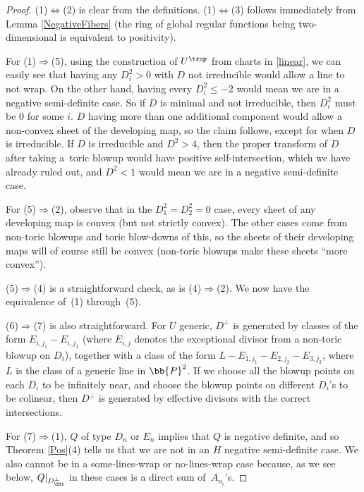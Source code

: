 \begin{proof}(1)$\Leftrightarrow$(2) is clear from the definitions. (1)$\Leftrightarrow$(3) follows immediately from Lemma \ref{NegativeFibers} (the ring of global regular functions being two-dimensional is equivalent to positivity).

For (1)$\Rightarrow$(5), using the construction of $U^{\trop}$ from charts in \eqref{linear}, we can easily see that having any $D_i^2>0$ with $D$ not irreducible would allow a line to not wrap. On the other hand, having every $D_i^2 \leq -2$ would mean we are in a negative semi-definite case. So if $D$ is minimal and not irreducible, then $D_i^2$ must be $0$ for some $i$. $D$ having more than one additional component would allow a non-convex sheet of the developing map, so the claim follows, except for when $D$ is irreducible. If $D$ is irreducible and $D^2 > 4$, then the proper transform of $D$ after taking a~toric blowup would have positive self-intersection, which we have already ruled out, and $D^2<1$ would mean we are in a negative semi-definite case.

For (5)$\Rightarrow$(2), observe that in the $D_1^2=D_2^2=0$ case, every sheet of any developing map is convex (but not strictly convex). The other cases come from non-toric blowups and toric blow-downs of this, so the sheets of their developing maps will of course still be convex (non-toric blowups make these sheets ``more convex'').

(5)$\Rightarrow$(4) is a straightforward check, as is (4)$\Rightarrow$(2). We now have the equivalence of~(1) through~(5).

(6)$\Rightarrow$(7) is also straightforward. For $U$ generic, $D^{\perp}$ is generated by classes of the form $E_{i,j_1}-E_{i,j_2}$ (where $E_{i,j}$ denotes the exceptional divisor from a non-toric blowup on $D_i$), together with a class of the form $L-E_{1,j_1} - E_{2,j_2} - E_{3,j_3}$, where $L$ is the class of a generic line in $\bb{P}^2$. If we choose all the blowup points on each $D_i$ to be infinitely near, and choose the blowup points on different $D_i$'s to be colinear, then $D^{\perp}$ is generated by effective divisors with the correct intersections.

For (7)$\Rightarrow$(1), $Q$ of type $D_n$ or $E_n$ implies that $Q$ is negative definite, and so Theorem \ref{Pos}(4) tells us that we are not in an $H$ negative semi-definite case. We also cannot be in a some-lines-wrap or no-lines-wrap case because, as we see below, $Q|_{D^{\perp}_{\Eff}}$ in these cases is a direct sum of~$A_{n_i}$'s.


\end{proof}
